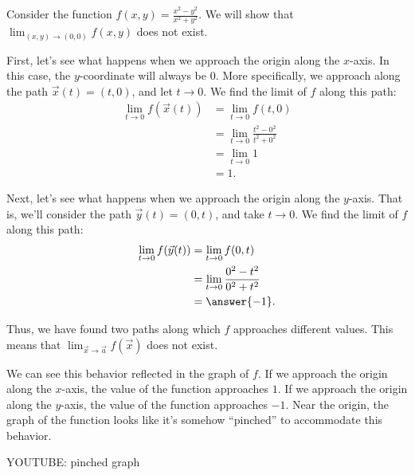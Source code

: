 \documentclass{ximera}
\begin{document}
\begin{example}
Consider the function $f(x,y) = \frac{x^2-y^2}{x^2+y^2}$. We will show that $\lim_{(x,y)\rightarrow(0,0)} f(x,y)$ does not exist.

First, let's see what happens when we approach the origin along the $x$-axis. In this case, the $y$-coordinate will always be $0$. More specifically, we approach along the path $\vec{x}(t) = (t,0)$, and let $t\rightarrow 0$. We find the limit of $f$ along this path:
\begin{align*}
\lim_{t\rightarrow 0}f(\vec{x}(t)) &= \lim_{t\rightarrow 0}f(t,0)\\
&= \lim_{t\rightarrow 0}\frac{t^2-0^2}{t^2+0^2}\\
&= \lim_{t\rightarrow 0}1\\
&= 1.
\end{align*}

Next, let's see what happens when we approach the origin along the $y$-axis. That is, we'll consider the path $\vec{y}(t) = (0,t)$, and take $t\rightarrow 0$. We find the limit of $f$ along this path:
\begin{align*}
\lim_{t\rightarrow 0}f(\vec{y}(t)) &= \lim_{t\rightarrow 0}f(0,t)\\
&= \lim_{t\rightarrow 0}\frac{0^2-t^2}{0^2+t^2}\\
&= \answer{-1}.
\end{align*}

Thus, we have found two paths along which $f$ approaches different values. This means that $\lim_{\vec{x}\rightarrow\vec{a}}f(\vec{x})$ does not exist.

We can see this behavior reflected in the graph of $f$. If we approach the origin along the $x$-axis, the value of the function approaches $1$. If we approach the origin along the $y$-axis, the value of the function approaches $-1$. Near the origin, the graph of the function looks like it's somehow ``pinched'' to accommodate this behavior.

YOUTUBE: pinched graph
\end{example}
\end{document}
